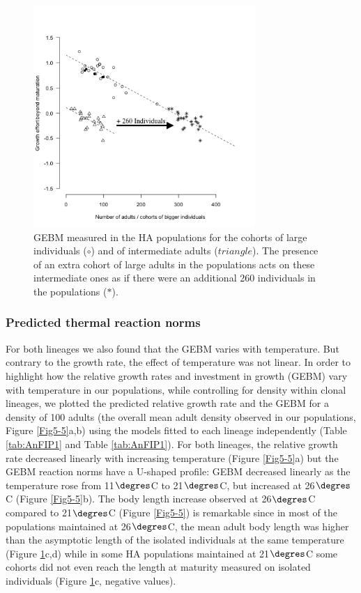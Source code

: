 \begin{figure}[!ht]
\begin{center}
\includegraphics[width=0.75\textwidth]{1_CorpsDeThese/Resumes/Fig/FIP06}
\caption[GEBM in populations of clone
HA at $21\degres$C]{GEBM measured in the HA populations for the cohorts of large
individuals ($\circ$) and of intermediate adults ($triangle$). The presence of
an extra cohort of large adults in the populations acts on these intermediate
ones as if there were an additional 260 individuals in the populations
($\ast$).}
\label{fig:AnFIP6}
\end{center}
\end{figure}

\subsubsection{Predicted thermal reaction norms}

For both lineages we also found that the GEBM varies with temperature. But
contrary to the growth rate, the effect of temperature was not linear. In order
to highlight how the relative growth rates and investment in growth (GEBM) vary
with temperature in our populations, while controlling for density within clonal
lineages, we plotted the predicted relative growth rate and the GEBM for a
density of 100 adults (the overall mean adult density observed in our
populations, Figure \ref{Fig5-5}a,b) using the models fitted to each lineage
independently (Table \ref{tab:AnFIP1} and Table \ref{tab:AnFIP1}). For both
lineages, the relative growth rate decreased linearly with increasing
temperature (Figure \ref{Fig5-5}a) but the GEBM reaction norms have a U-shaped
profile: GEBM decreased linearly as the temperature rose from 11$\degres$C to
21$\degres$C, but increased at 26$\degres$C (Figure \ref{Fig5-5}b). The body
length increase observed at 26$\degres$C compared to 21$\degres$C (Figure
\ref{Fig5-5}) is remarkable since in most of the populations maintained at
26$\degres$C, the mean adult body length was higher than the asymptotic length
of the isolated individuals at the same temperature (Figure \ref{fig:AnFIP6}c,d)
while in some HA populations maintained at 21$\degres$C some cohorts did not
even reach the length at maturity measured on isolated individuals (Figure
\ref{fig:AnFIP6}c, negative values).

